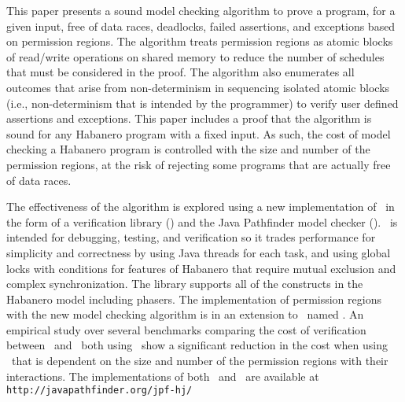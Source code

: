 This paper presents a sound model checking algorithm to prove a
program, for a given input, free of data races, deadlocks, failed assertions, and exceptions based on
permission regions.  The algorithm treats permission regions as atomic
blocks of read/write operations on shared memory to reduce the number
of schedules that must be considered in the proof. The algorithm also enumerates all
outcomes that arise from non-determinism in sequencing isolated atomic
blocks (i.e., non-determinism that is intended by the programmer) to
verify user defined assertions and exceptions. This paper includes a proof that the
algorithm is sound for any Habanero program with a fixed input. As
such, the cost of model checking a Habanero program is controlled with
the size and number of the permission regions, at the risk of
rejecting some programs that are actually free of data races.

The effectiveness of the algorithm is explored using a new
implementation of \hj\ in the form of a verification library (\hjv) and the Java
Pathfinder model checker (\jpf). \hjv\ is intended for debugging,
testing, and verification so it trades performance for simplicity and
correctness by using Java threads for each task, and using global
locks with conditions for features of Habanero that require mutual
exclusion and complex synchronization. The library supports all of the constructs in the Habanero model including phasers. The
implementation of permission regions with the new model checking
algorithm is in an extension to \jpf\ named
\jpfhj. An empirical study over
several benchmarks comparing the cost of verification between
\jpf\ and \jpfhj\ both using \hjv\ show a significant reduction in the
cost when using \jpfhj\ that is dependent on the size and number of
the permission regions with their interactions. The implementations of both \hjv\ and \jpfhj\ are available 
at \texttt{http://javapathfinder.org/jpf-hj/}


